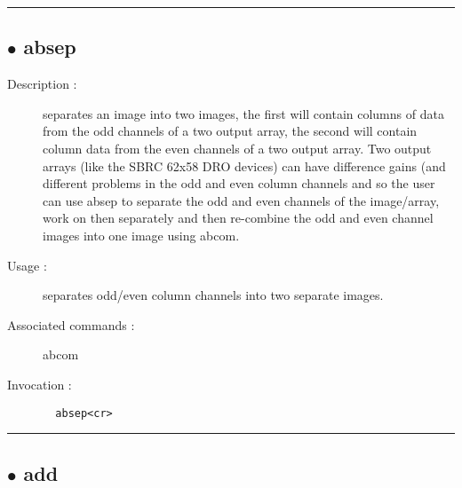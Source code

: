 \hrule \subsection*{$\bullet$ absep}
\begin{description}
\item[Description :] separates an image into two images, the first will contain
columns of data from the odd channels of a two output array, the second
will contain column data from the even channels of a two output array.
Two output arrays (like the SBRC 62x58 DRO devices) can have difference
gains (and different problems in the odd and even column channels and so
the user can use absep to separate the odd and even channels of the
image/array, work on then separately and then re-combine the odd and even
channel images into one image using abcom.
\item[Usage :] separates odd/even column channels into two separate images.
\item[Associated commands :] abcom
\item[Invocation :]

\verb+  absep<cr> +\end{description}

\hrule \subsection*{$\bullet$ add}

